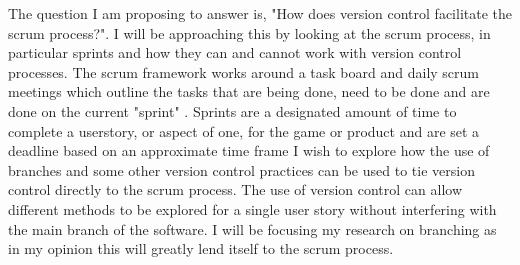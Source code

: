 \documentclass[10pt,a4paper]{article}
\author{Connor Seán Rodgers}
\begin{document}
The question I am proposing to answer is, "How does version control facilitate the scrum process?".  I will be approaching this by looking at the scrum process, in particular sprints and how they can and cannot work with version control processes. The scrum framework works around a task board and daily scrum meetings which outline the tasks that are being done, need to be done and are done on the current "sprint" \cite{rubart2009supporting}. Sprints are a designated amount of time to complete a userstory, or aspect of one, for the game or product and are set a deadline based on an approximate time frame \cite{dinakar2009agile} I wish to explore how the use of branches \cite {phillips2011branching} and some other version control practices can be used to tie version control directly to the scrum process. The use of version control can allow different methods to be explored for a single user story without interfering with the main branch of the software\cite {mikami2017micro}. I will be focusing my research on branching as in my opinion this will greatly lend itself to the scrum process\cite{rayana2016gitwaterflow}\cite{krusche2016teaching}.

{}

\end{document}
